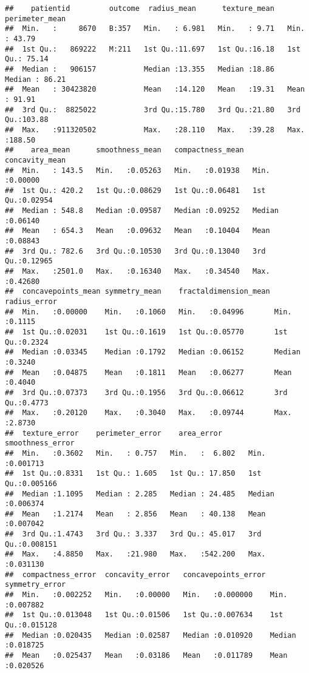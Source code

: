 \documentclass[
]{article}
\begin{document}
\begin{verbatim}
##    patientid         outcome  radius_mean      texture_mean   perimeter_mean  
##  Min.   :     8670   B:357   Min.   : 6.981   Min.   : 9.71   Min.   : 43.79  
##  1st Qu.:   869222   M:211   1st Qu.:11.697   1st Qu.:16.18   1st Qu.: 75.14  
##  Median :   906157           Median :13.355   Median :18.86   Median : 86.21  
##  Mean   : 30423820           Mean   :14.120   Mean   :19.31   Mean   : 91.91  
##  3rd Qu.:  8825022           3rd Qu.:15.780   3rd Qu.:21.80   3rd Qu.:103.88  
##  Max.   :911320502           Max.   :28.110   Max.   :39.28   Max.   :188.50  
##    area_mean      smoothness_mean   compactness_mean  concavity_mean   
##  Min.   : 143.5   Min.   :0.05263   Min.   :0.01938   Min.   :0.00000  
##  1st Qu.: 420.2   1st Qu.:0.08629   1st Qu.:0.06481   1st Qu.:0.02954  
##  Median : 548.8   Median :0.09587   Median :0.09252   Median :0.06140  
##  Mean   : 654.3   Mean   :0.09632   Mean   :0.10404   Mean   :0.08843  
##  3rd Qu.: 782.6   3rd Qu.:0.10530   3rd Qu.:0.13040   3rd Qu.:0.12965  
##  Max.   :2501.0   Max.   :0.16340   Max.   :0.34540   Max.   :0.42680  
##  concavepoints_mean symmetry_mean    fractaldimension_mean  radius_error   
##  Min.   :0.00000    Min.   :0.1060   Min.   :0.04996       Min.   :0.1115  
##  1st Qu.:0.02031    1st Qu.:0.1619   1st Qu.:0.05770       1st Qu.:0.2324  
##  Median :0.03345    Median :0.1792   Median :0.06152       Median :0.3240  
##  Mean   :0.04875    Mean   :0.1811   Mean   :0.06277       Mean   :0.4040  
##  3rd Qu.:0.07373    3rd Qu.:0.1956   3rd Qu.:0.06612       3rd Qu.:0.4773  
##  Max.   :0.20120    Max.   :0.3040   Max.   :0.09744       Max.   :2.8730  
##  texture_error    perimeter_error    area_error      smoothness_error  
##  Min.   :0.3602   Min.   : 0.757   Min.   :  6.802   Min.   :0.001713  
##  1st Qu.:0.8331   1st Qu.: 1.605   1st Qu.: 17.850   1st Qu.:0.005166  
##  Median :1.1095   Median : 2.285   Median : 24.485   Median :0.006374  
##  Mean   :1.2174   Mean   : 2.856   Mean   : 40.138   Mean   :0.007042  
##  3rd Qu.:1.4743   3rd Qu.: 3.337   3rd Qu.: 45.017   3rd Qu.:0.008151  
##  Max.   :4.8850   Max.   :21.980   Max.   :542.200   Max.   :0.031130  
##  compactness_error  concavity_error   concavepoints_error symmetry_error    
##  Min.   :0.002252   Min.   :0.00000   Min.   :0.000000    Min.   :0.007882  
##  1st Qu.:0.013048   1st Qu.:0.01506   1st Qu.:0.007634    1st Qu.:0.015128  
##  Median :0.020435   Median :0.02587   Median :0.010920    Median :0.018725  
##  Mean   :0.025437   Mean   :0.03186   Mean   :0.011789    Mean   :0.020526  

\end{verbatim}
\end{document}
